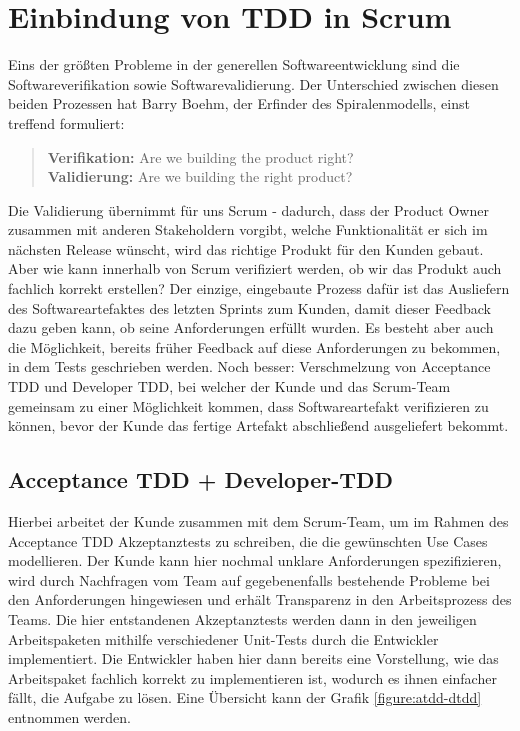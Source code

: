 \documentclass[12pt,DIV14,BCOR10mm,a4paper,twoside,parskip=half-,headsepline,headinclude,english,ngerman,bibliography=totocnumbered]{scrreprt}
\begin{document}
\chapter{Einbindung von TDD in Scrum}

Eins der größten Probleme in der generellen Softwareentwicklung sind die Softwareverifikation sowie Softwarevalidierung.
Der Unterschied zwischen diesen beiden Prozessen hat Barry Boehm, der Erfinder des Spiralenmodells, einst treffend formuliert:

\blockquote{
\textbf{Verifikation:} Are we building the product right? \\
\textbf{Validierung:} Are we building the right product?
}

Die Validierung übernimmt für uns Scrum - dadurch, dass der Product Owner zusammen mit anderen Stakeholdern vorgibt, welche Funktionalität er sich im nächsten Release wünscht, wird das richtige Produkt für den Kunden gebaut.
Aber wie kann innerhalb von Scrum verifiziert werden, ob wir das Produkt auch fachlich korrekt erstellen?
Der einzige, eingebaute Prozess dafür ist das Ausliefern des Softwareartefaktes des letzten Sprints zum Kunden, damit dieser Feedback dazu geben kann, ob seine Anforderungen erfüllt wurden.
Es besteht aber auch die Möglichkeit, bereits früher Feedback auf diese Anforderungen zu bekommen, in dem Tests geschrieben werden.
Noch besser: Verschmelzung von Acceptance TDD und Developer TDD, bei welcher der Kunde und das Scrum-Team gemeinsam zu einer Möglichkeit kommen, dass Softwareartefakt verifizieren zu können, bevor der Kunde das fertige Artefakt abschließend ausgeliefert bekommt.

\section{Acceptance TDD + Developer-TDD}

Hierbei arbeitet der Kunde zusammen mit dem Scrum-Team, um im Rahmen des Acceptance TDD Akzeptanztests zu schreiben, die die gewünschten Use Cases modellieren.
Der Kunde kann hier nochmal unklare Anforderungen spezifizieren, wird durch Nachfragen vom Team auf gegebenenfalls bestehende Probleme bei den Anforderungen hingewiesen und erhält Transparenz in den Arbeitsprozess des Teams.
Die hier entstandenen Akzeptanztests werden dann in den jeweiligen Arbeitspaketen mithilfe verschiedener Unit-Tests durch die Entwickler implementiert.
Die Entwickler haben hier dann bereits eine Vorstellung, wie das Arbeitspaket fachlich korrekt zu implementieren ist, wodurch es ihnen einfacher fällt, die Aufgabe zu lösen.
Eine Übersicht kann der Grafik \ref{figure:atdd-dtdd} entnommen werden.
\end{document}
